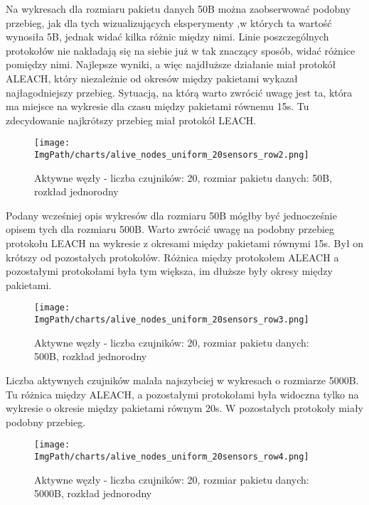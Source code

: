 Na wykresach dla rozmiaru pakietu danych 50B można zaobserwować podobny przebieg, jak dla tych wizualizujących eksperymenty ,w których ta wartość wynosiła 5B, jednak widać kilka różnic między nimi. Linie poszczególnych protokołów nie nakładają się na siebie już w tak znaczący sposób, widać różnice pomiędzy nimi. Najlepsze wyniki, a więc najdłuższe działanie miał protokół ALEACH, który niezależnie od okresów między pakietami wykazał najłagodniejszy przebieg. Sytuacją, na którą warto zwrócić uwagę jest ta, która ma miejsce na wykresie dla czasu między pakietami równemu 15s. Tu zdecydowanie najkrótszy przebieg miał protokół LEACH.

\begin{figure}[H]
	\begin{center}
		\texttt{[image: \\ImgPath/charts/alive\_nodes\_uniform\_20sensors\_row2.png]}
	\end{center}
	\caption{Aktywne węzły - liczba czujników: 20, rozmiar pakietu danych: 50B, rozkład jednorodny}
\end{figure}

 Podany wcześniej opis wykresów dla rozmiaru 50B mógłby być jednocześnie opisem tych dla rozmiaru 500B. Warto zwrócić uwagę na podobny przebieg protokołu LEACH na wykresie z okresami między pakietami równymi 15s. Był on krótszy od pozostałych protokołów. Różnica między protokołem ALEACH a pozostałymi protokołami była tym większa, im dłuższe były okresy między pakietami.

\begin{figure}[H]
	\begin{center}
		\texttt{[image: \\ImgPath/charts/alive\_nodes\_uniform\_20sensors\_row3.png]}
	\end{center}
	\caption{Aktywne węzły - liczba czujników: 20, rozmiar pakietu danych: 500B, rozkład jednorodny}
\end{figure} 
  
Liczba aktywnych czujników malała najszybciej w wykresach o rozmiarze 5000B. Tu różnica między ALEACH, a pozostałymi protokołami była widoczna tylko na wykresie o okresie między pakietami równym 20s. W pozostałych protokoły miały podobny przebieg. 

\begin{figure}[H]
	\begin{center}
		\texttt{[image: \\ImgPath/charts/alive\_nodes\_uniform\_20sensors\_row4.png]}
	\end{center}
	\caption{Aktywne węzły - liczba czujników: 20, rozmiar pakietu danych: 5000B, rozkład jednorodny}
\end{figure}



